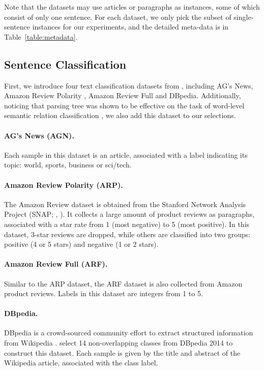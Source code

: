 \documentclass[11pt,a4paper]{article}
\begin{document}
Note that the datasets may use articles or paragraphs as instances, some of which consist of only one sentence. 
For each dataset, we only pick the subset of single-sentence instances for our experiments, and the detailed meta-data is in Table~\ref{table:metadata}. 

\subsection{Sentence Classification}
First, we introduce four text classification datasets from , including AG's News, Amazon Review Polarity , Amazon Review Full and DBpedia. 
Additionally, noticing that parsing tree was shown to be effective \cite{li2015tree} on the task of word-level semantic relation classification \cite{hendrickx2009semeval}, we also add this dataset to our selections.  

\paragraph{AG's News (AGN).} 
Each sample in this dataset is an article, associated with a label indicating its topic: world, sports, business or sci/tech. 

\paragraph{Amazon Review Polarity (ARP).}
The Amazon Review dataset is obtained from the Stanford Network Analysis Project (SNAP; \citeauthor{mcauley2013hidden}, \citeyear{mcauley2013hidden}). 
It collects a large amount of product reviews as paragraphs, associated with a star rate from 1 (most negative) to 5 (most positive).
In this dataset, 3-star reviews are dropped, while others are classified into two groups: positive (4 or 5 stars) and negative (1 or 2 stars). 

\paragraph{Amazon Review Full (ARF).}
Similar to the ARP dataset, the ARF dataset is also collected from Amazon product reviews. 
Labels in this dataset are integers from 1 to 5. 

\paragraph{DBpedia.}
DBpedia is a crowd-sourced community effort to extract structured
information from Wikipedia \cite{lehmann2015dbpedia}. 
 select 14 non-overlapping
classes from DBpedia 2014 to construct this dataset. 
Each sample is given by the title and abstract of the Wikipedia article, associated with the class label.
\end{document}

